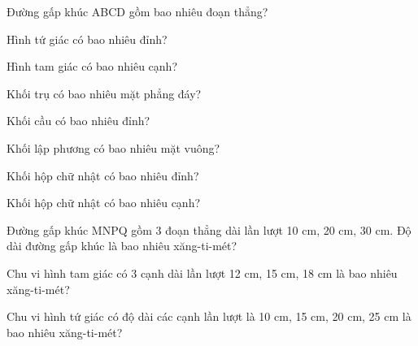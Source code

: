 \begin{ex}
Đường gấp khúc ABCD gồm bao nhiêu đoạn thẳng?
\end{ex}

\begin{ex}
Hình tứ giác có bao nhiêu đỉnh?
\end{ex}

\begin{ex}
Hình tam giác có bao nhiêu cạnh?
\end{ex}

\begin{ex}
Khối trụ có bao nhiêu mặt phẳng đáy?
\end{ex}

\begin{ex}
Khối cầu có bao nhiêu đỉnh?
\end{ex}

\begin{ex}
Khối lập phương có bao nhiêu mặt vuông?
\end{ex}

\begin{ex}
Khối hộp chữ nhật có bao nhiêu đỉnh?
\end{ex}

\begin{ex}
Khối hộp chữ nhật có bao nhiêu cạnh?
\end{ex}

\begin{ex}
Đường gấp khúc MNPQ gồm 3 đoạn thẳng dài lần lượt 10 cm, 20 cm, 30 cm. Độ dài đường gấp khúc là bao nhiêu xăng-ti-mét?
\end{ex}

\begin{ex}
Chu vi hình tam giác có 3 cạnh dài lần lượt 12 cm, 15 cm, 18 cm là bao nhiêu xăng-ti-mét?
\end{ex}

\begin{ex}
Chu vi hình tứ giác có độ dài các cạnh lần lượt là 10 cm, 15 cm, 20 cm, 25 cm là bao nhiêu xăng-ti-mét?
\end{ex}

